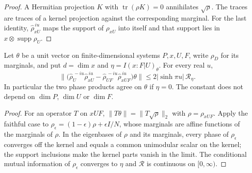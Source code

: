 \begin{proof}\leanok
    A Hermitian projection $K$ with $\operatorname{tr}(\rho K)=0$ annihilates
    $\sqrt\rho$. The traces are traces of a kernel projection against the
    corresponding marginal. For the last identity, $\widehat\rho_{xU}^{\,iu}$
    maps the support of $\rho_{xU}$ into itself and that support lies in
    $x\otimes\operatorname{supp}\rho_U$.
\end{proof}

\begin{theorem}
    \label{thm:marginal_phase}
    \leanok
    Let $\theta$ be a unit vector on finite-dimensional systems $P,x,U,F$, write
    $\rho_D$ for its marginals, and put $d=\dim x$ and
    $\eta=I(x:F|U)_\theta$. For every real $u$,
    \[
      \bigl\lVert\bigl(\widehat\rho_U^{\,-iu}\widehat\rho_{xU}^{\,iu}
        -\widehat\rho_{UF}^{\,-iu}\widehat\rho_{xUF}^{\,iu}\bigr)\theta\bigr\rVert
      \le2|\sinh\pi u|\,\mathcal R_\eta .
    \]
    In particular the two phase products agree on $\theta$ if $\eta=0$. The
    constant does not depend on $\dim P$, $\dim U$ or $\dim F$.
\end{theorem}

\begin{proof}\leanok
    For an operator $T$ on $xUF$, $\lVert T\theta\rVert=\lVert T\sqrt\rho\rVert_2$
    with $\rho=\rho_{xUF}$. Apply the faithful case to
    $\rho_\epsilon=(1-\epsilon)\rho+\epsilon I/N$, whose marginals are affine
    functions of the marginals of $\rho$. In the eigenbases of $\rho$ and its
    marginals, every phase of $\rho_\epsilon$ converges off the kernel and
    equals a common unimodular scalar on the kernel; the support inclusions make
    the kernel parts vanish in the limit. The conditional mutual information of
    $\rho_\epsilon$ converges to $\eta$ and $\mathcal R$ is continuous on
    $[0,\infty)$.
\end{proof}
